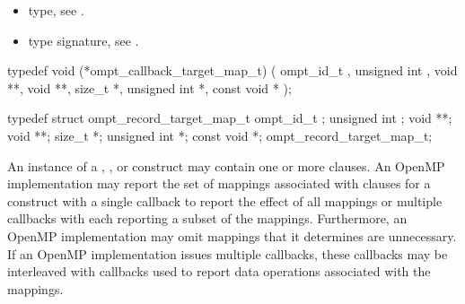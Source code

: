 \crossreferences
\begin{itemize}
\item {} type, see
.
\item {} type signature, see
.
\end{itemize}




\label{sec:ompt_callback_target_map_t}
\format

\begin{ccppspecific}
\begin{omptCallback}
typedef void (*ompt_callback_target_map_t) (
  ompt_id_t ,
  unsigned int ,
  void **,
  void **,
  size_t *,
  unsigned int *,
  const void *
);
\end{omptCallback}
\end{ccppspecific}


\record

\begin{ccppspecific}
\begin{omptRecord}
typedef struct ompt_record_target_map_t {
  ompt_id_t ;
  unsigned int ;
  void **;
  void **;
  size_t *;
  unsigned int *;
  const void *;
} ompt_record_target_map_t;
\end{omptRecord}
\end{ccppspecific}


\descr
An instance of a , , or  construct may contain one or more  clauses.
An OpenMP implementation may report the set of mappings associated with  clauses for a construct
with a single  callback to report the effect of all mappings or multiple
 callbacks with each reporting a subset of the mappings.
Furthermore, an OpenMP implementation may omit mappings that it determines are unnecessary.
If an OpenMP implementation issues multiple 
callbacks, these callbacks may be interleaved with  callbacks
used to report data operations associated with the mappings.

\argdesc

